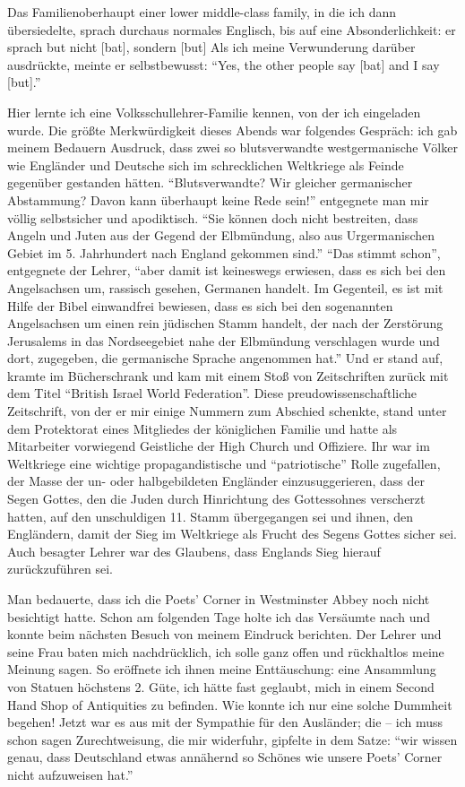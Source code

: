 Das Familienoberhaupt einer lower middle-class family, in die ich dann übersiedelte, sprach durchaus normales Englisch, bis auf eine Absonderlichkeit: er sprach but nicht [bat], sondern [but] Als ich meine Verwunderung darüber ausdrückte, meinte er selbstbewusst: \enquote{Yes, the other people say [bat] and I say [but].}

Hier lernte ich eine Volksschullehrer-Familie kennen, von der ich eingeladen wurde. Die größte Merkwürdigkeit dieses Abends war folgendes Gespräch: ich gab meinem Bedauern Ausdruck, dass zwei so blutsverwandte westgermanische Völker wie Engländer und Deutsche sich im schrecklichen Weltkriege als Feinde gegenüber gestanden hätten. \enquote{Blutsverwandte? Wir gleicher germanischer Abstammung? Davon kann überhaupt keine Rede sein!} entgegnete man mir völlig selbstsicher und apodiktisch. \enquote{Sie können doch nicht bestreiten, dass Angeln und Juten aus der Gegend der Elbmündung, also aus Urgermanischen Gebiet im 5. Jahrhundert nach England gekommen sind.} \enquote{Das stimmt schon}, entgegnete der Lehrer, \enquote{aber damit ist keineswegs erwiesen, dass es sich bei den Angelsachsen um, rassisch gesehen, Germanen handelt. Im Gegenteil, es ist mit Hilfe der Bibel einwandfrei bewiesen, dass es sich bei den sogenannten Angelsachsen um einen rein jüdischen Stamm handelt, der nach der Zerstörung Jerusalems in das Nordseegebiet nahe der Elbmündung verschlagen wurde und dort, zugegeben, die germanische Sprache angenommen hat.} Und er stand auf, kramte im Bücherschrank und kam mit einem Stoß von Zeitschriften zurück mit dem Titel \enquote{British Israel World Federation}. Diese preudowissenschaftliche Zeitschrift, von der er mir einige Nummern zum Abschied schenkte, stand unter dem Protektorat eines Mitgliedes der königlichen Familie und hatte als Mitarbeiter vorwiegend Geistliche der High Church und Offiziere. Ihr war im Weltkriege eine wichtige propagandistische und \enquote{patriotische} Rolle zugefallen, der Masse der un- oder halbgebildeten Engländer einzusuggerieren, dass der Segen Gottes, den die Juden durch Hinrichtung des Gottessohnes verscherzt hatten, auf den unschuldigen 11. Stamm übergegangen sei und ihnen, den Engländern, damit der Sieg im Weltkriege als Frucht des Segens Gottes sicher sei. Auch besagter Lehrer war des Glaubens, dass Englands Sieg hierauf zurückzuführen sei.

Man bedauerte, dass ich die Poets' Corner in Westminster Abbey noch nicht besichtigt hatte. Schon am folgenden Tage holte ich das Versäumte nach und konnte beim nächsten Besuch von meinem Eindruck berichten. Der Lehrer und seine Frau baten mich nachdrücklich, ich solle ganz offen und rückhaltlos meine Meinung sagen. So eröffnete ich ihnen meine Enttäuschung: eine Ansammlung von Statuen höchstens 2. Güte, ich hätte fast geglaubt, mich in einem Second Hand Shop of Antiquities zu befinden. Wie konnte ich nur eine solche Dummheit begehen! Jetzt war es aus mit der Sympathie für den Ausländer; die -- ich muss schon sagen Zurechtweisung, die mir widerfuhr, gipfelte in dem Satze: \enquote{wir wissen genau, dass Deutschland etwas annähernd so Schönes wie unsere Poets' Corner nicht aufzuweisen hat.}

